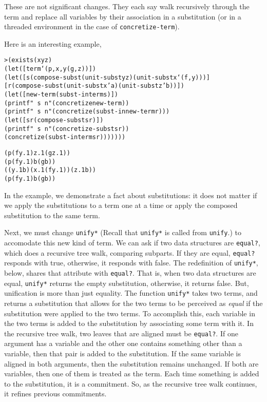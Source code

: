 These are not significant changes.  They each say walk recursively
through the term and replace all variables by their association in a
substitution (or in a threaded environment in the case of \texttt{concretize-term}).

Here is an interesting example,

\begin{alltt} 
> (exists (x y z)
    (let ([term `(p ,x ,y (g ,z))])
      (let ([s (compose-subst (unit-subst y z) (unit-subst x `(f ,y)))]
            [r (compose-subst (unit-subst x 'a) (unit-subst z 'b))])
        (let ([new-term (subst-in term s)])
          (printf "~s~n" (concretize new-term))
          (printf "~s~n" (concretize (subst-in new-term r)))
          (let ([sr (compose-subst s r)])
            (printf "~s~n" (concretize-subst sr))
            (concretize (subst-in term sr)))))))
\end{alltt}

\begin{alltt}
(p (f y.1) z.1 (g z.1))
(p (f y.1) b (g b))
((y.1 b) (x.1 (f y.1)) (z.1 b))
(p (f y.1) b (g b))
\end{alltt}

In the example, we demonstrate a fact about substitutions: it does not
matter if we apply the substitutions to a term one at a time or apply
the composed substitution to the same term.

Next, we must change \texttt{unify*} (Recall that \texttt{unify*} is
called from \texttt{unify}.) to accomodate this new kind of term.  We
can ask if two data structures are \texttt{equal?}, which does a
recursive tree walk, comparing subparts.  If they are equal,
\texttt{equal?} responds with true, otherwise, it responds with false.
The redefinition of \texttt{unify*}, below, shares that attribute with
\texttt{equal?}. That is, when two data structures are equal,
\texttt{unify*} returns the empty substitution, otherwise, it returns
false.  But, unification is more than just equality.  The function
\texttt{unify*} takes two terms, and returns a substitution that allows
for the two terms to be perceived as \emph{equal} if the substitution
were applied to the two terms.  To accomplish this, each variable in
the two terms is added to the substitution by associating some term
with it.  In the recursive tree walk, two leaves that are aligned must
be \texttt{equal?}.  If one argument has a variable and the other one
contains something other than a variable, then that pair is added to
the substitution.  If the same variable is aligned in both arguments,
then the substitution remains unchanged.  If both are variables, then
one of them is treated as the term.  Each time something is added to
the substitution, it is a commitment. So, as the recursive tree walk
continues, it refines previous commitments.

